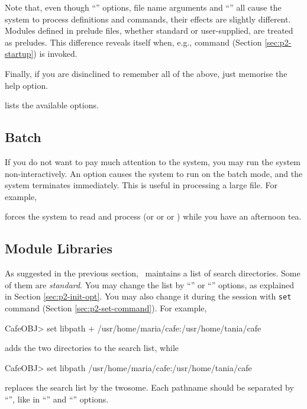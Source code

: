 \documentclass[a4paper]{memoir}
\begin{document}
Note that, even though ``'' options, file name arguments and
``'' all cause the system to process definitions and
commands, their effects are slightly different. Modules defined in
prelude files, whether standard or user-supplied, are treated as
preludes. This difference reveals itself when, e.g., 
command (Section \ref{sec:p2-startup}) is invoked.

Finally, if you are disinclined to remember all of the above,
just memorise the help option.
\begin{vvtm}
\begin{ccode}
\end{ccode}
\end{vvtm}
lists the available options.

\subsection{Batch \cafeobj} \label{sec:p2-batch}

If you do not want to pay much attention to the system,
you may run the system non-interactively.
An option  causes the system to run on the batch mode,
and the system terminates immediately. This is useful in processing
a large file. For example,
\begin{vvtm}
\begin{ccode}
\end{ccode}
\end{vvtm}
forces the system to read and process  (or 
or  or ) while you have an afternoon tea.

\subsection{Module Libraries} \label{sec:p2-lib-system}

As suggested in the previous section, \cafeobj~maintains a list of
search directories. Some of them are {\em standard}.
You may change the list by ``'' or ``'' options,
as explained in Section \ref{sec:p2-init-opt}. You may also change it
during the session with \verb|set| command (Section \ref{sec:p2-set-command}).
For example,
\begin{vvtm}
\begin{ccode}
  CafeOBJ> set libpath + /usr/home/maria/cafe:/usr/home/tania/cafe
\end{ccode}
\end{vvtm}
adds the two directories to the search list, while
\begin{vvtm}
\begin{ccode}
  CafeOBJ> set libpath /usr/home/maria/cafe:/usr/home/tania/cafe
\end{ccode}
\end{vvtm}
replaces the search list by the twosome.
Each pathname should be separated by ``\kbd{:}'', like in
``'' and ``'' options.
\end{document}
